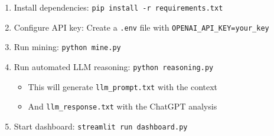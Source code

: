 \documentclass[a4paper,twoside,12pt]{article}
\begin{document}
\begin{enumerate}
    \item Install dependencies: \texttt{pip install -r requirements.txt}
    \item Configure API key: Create a \texttt{.env} file with \texttt{OPENAI\_API\_KEY=your\_key}
    \item Run mining: \texttt{python mine.py}
    \item Run automated LLM reasoning: \texttt{python reasoning.py}
    \begin{itemize}
        \item This will generate \texttt{llm\_prompt.txt} with the context
        \item And \texttt{llm\_response.txt} with the ChatGPT analysis
    \end{itemize}
    \item Start dashboard: \texttt{streamlit run dashboard.py}
\end{enumerate}
\end{document}
